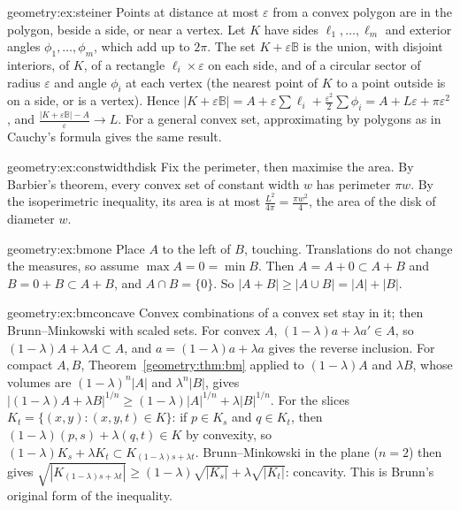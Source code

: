 \begin{solution}{geometry:ex:steiner}
\idea Points at distance at most $\varepsilon$ from a convex polygon are in the polygon, beside a side, or near a vertex.
\writeup Let $K$ have sides $\ell_1,\dots,\ell_m$ and exterior angles $\phi_1,\dots,\phi_m$, which add up to $2\pi$. The set $K+\varepsilon\mathbb B$ is the union, with
disjoint interiors, of $K$, of a rectangle $\ell_i\times\varepsilon$ on each side, and of a circular sector of radius $\varepsilon$ and angle $\phi_i$ at each vertex (the
nearest point of $K$ to a point outside is on a side, or is a vertex). Hence $|K+\varepsilon\mathbb B|=A+\varepsilon\sum\ell_i+\frac{\varepsilon^2}2\sum\phi_i=A+L\varepsilon+\pi\varepsilon^2$,
and $\frac{|K+\varepsilon\mathbb B|-A}\varepsilon\to L$. For a general convex set, approximating by polygons as in Cauchy's formula gives the same result.
\end{solution}

\begin{solution}{geometry:ex:constwidthdisk}
\idea Fix the perimeter, then maximise the area.
\writeup By Barbier's theorem, every convex set of constant width $w$ has perimeter $\pi w$. By the isoperimetric inequality, its area is at most
$\frac{L^2}{4\pi}=\frac{\pi w^2}4$, the area of the disk of diameter $w$.
\end{solution}

\begin{solution}{geometry:ex:bmone}
\idea Place $A$ to the left of $B$, touching.
\writeup Translations do not change the measures, so assume $\max A=0=\min B$. Then $A=A+0\subset A+B$ and $B=0+B\subset A+B$, and $A\cap B=\{0\}$. So
$|A+B|\ge|A\cup B|=|A|+|B|$.
\end{solution}

\begin{solution}{geometry:ex:bmconcave}
\idea Convex combinations of a convex set stay in it; then Brunn--Minkowski with scaled sets.
\writeup For convex $A$, $(1-\lambda)a+\lambda a'\in A$, so $(1-\lambda)A+\lambda A\subset A$, and $a=(1-\lambda)a+\lambda a$ gives the reverse inclusion. For compact $A,B$,
Theorem~\ref{geometry:thm:bm} applied to $(1-\lambda)A$ and $\lambda B$, whose volumes are $(1-\lambda)^n|A|$ and $\lambda^n|B|$, gives
$|(1-\lambda)A+\lambda B|^{1/n}\ge(1-\lambda)|A|^{1/n}+\lambda|B|^{1/n}$. For the slices $K_t=\{(x,y):(x,y,t)\in K\}$: if $p\in K_s$ and $q\in K_t$, then
$(1-\lambda)(p,s)+\lambda(q,t)\in K$ by convexity, so $(1-\lambda)K_s+\lambda K_t\subset K_{(1-\lambda)s+\lambda t}$. Brunn--Minkowski in the plane ($n=2$) then gives
$\sqrt{|K_{(1-\lambda)s+\lambda t}|}\ge(1-\lambda)\sqrt{|K_s|}+\lambda\sqrt{|K_t|}$: concavity. This is Brunn's original form of the inequality.
\end{solution}

